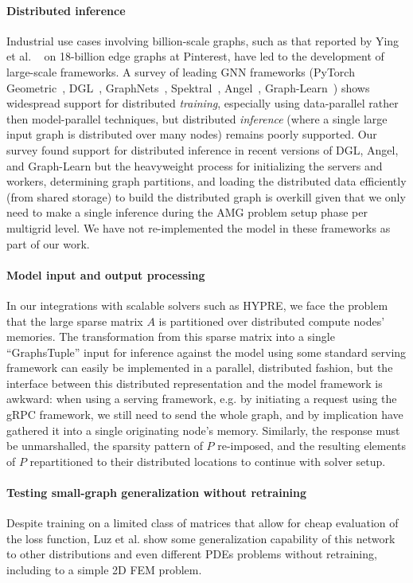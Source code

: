 \documentclass{svproc}
\newcommand{\etal}{et al. }
\begin{document}
\paragraph{Distributed inference}
Industrial use cases involving billion-scale graphs, such as that reported by Ying \etal~\cite{Ying_2018} on 18-billion edge graphs at Pinterest, have led to the development of large-scale frameworks.
A survey of leading GNN frameworks (PyTorch Geometric~\cite{pytorch-geometric}, DGL~\cite{DGL}, GraphNets~\cite{battaglia2018relational}, Spektral~\cite{grattarola2021graph}, Angel~\cite{angel}, Graph-Learn~\cite{yang2019aligraph}) shows widespread support for distributed \textit{training}, especially using data-parallel rather then model-parallel techniques, but distributed \textit{inference} (where a single large input graph is distributed over many nodes) remains poorly supported. Our survey found support for distributed inference in recent versions of DGL, Angel, and Graph-Learn but the heavyweight process for initializing the servers and workers, determining graph partitions, and loading the distributed data efficiently (from shared storage) to build the distributed graph is overkill given that we only need to make a single inference during the AMG problem setup phase per multigrid level. We have not re-implemented the model in these frameworks as part of our work.
 

\paragraph{Model input and output processing}
In our integrations with scalable solvers such as HYPRE, we face the problem that the large sparse matrix $A$ is partitioned over distributed compute nodes' memories. The transformation from this sparse matrix into a single ``GraphsTuple'' input for inference against the model using some standard serving framework can easily be implemented in a parallel, distributed fashion, but the interface between this distributed representation and the model framework is awkward: when using a serving framework, e.g. by initiating a request using the gRPC framework, we still need to send the whole graph, and by implication have gathered it into a single originating node's memory. Similarly, the response must be unmarshalled, the sparsity pattern of $P$ re-imposed, and the resulting elements of $P$ repartitioned to their distributed locations to continue with solver setup.

\paragraph{Testing small-graph generalization without retraining}
Despite training on a limited class of matrices that allow for cheap evaluation of the loss function, Luz \etal show some generalization capability of this network to other distributions and even different PDEs problems without retraining, including to a simple 2D FEM problem.
\end{document}
